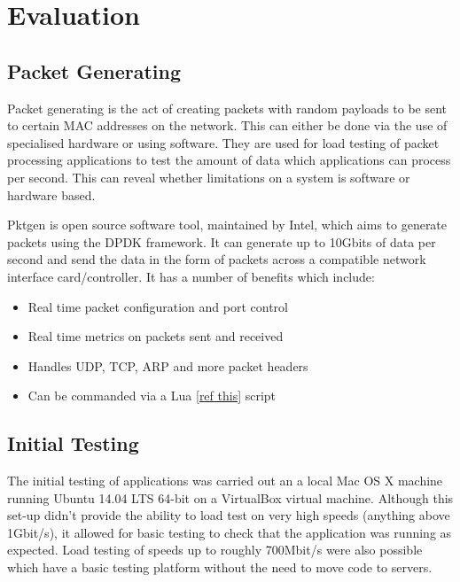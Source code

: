 \documentclass[final_report.tex]{subfiles}
\begin{document}
\section{Evaluation}

\subsection{Packet Generating}
Packet generating is the act of creating packets with random payloads to be sent to certain MAC addresses on the network. This can either be done via the use of specialised hardware or using software. They are used for load testing of packet processing applications to test the amount of data which applications can process per second. This can reveal whether limitations on a system is software or hardware based.


Pktgen is open source software tool, maintained by Intel, which aims to generate packets using the DPDK framework. It can generate up to 10Gbits of data per second and send the data in the form of packets across a compatible network interface card/controller. It has a number of benefits which include:

\begin{itemize}
	\item Real time packet configuration and port control
	\item Real time metrics on packets sent and received
	\item Handles UDP, TCP, ARP and more packet headers
	\item Can be commanded via a Lua \ref{ref this} script
\end{itemize}


\subsection{Initial Testing}
The initial testing of applications  was carried out an a local Mac OS X machine running Ubuntu 14.04 LTS 64-bit on a VirtualBox  virtual machine. Although this set-up didn't provide the ability to load test on very high speeds (anything above 1Gbit/s), it allowed for basic testing to check that the application was running as expected. Load testing of speeds up to roughly 700Mbit/s were also possible which have a basic testing platform without the need to move code to servers.
\end{document}
